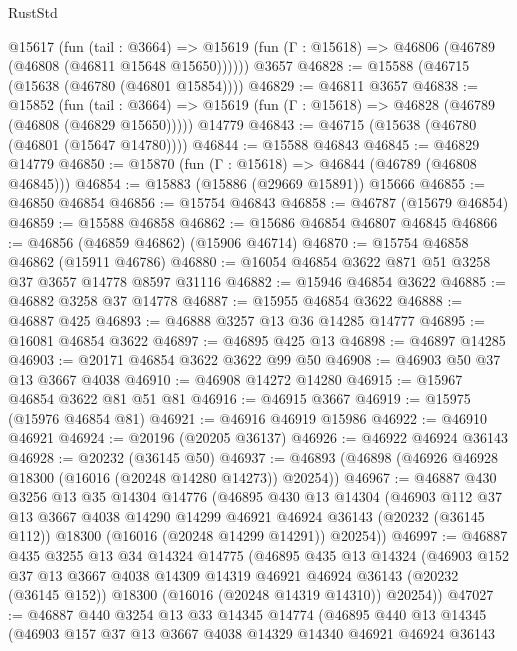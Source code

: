 \begin{lexlean}{RustStd}
\begin{coremodule}
    @15617
      (fun (tail : @3664) =>
      @15619 (fun (Γ : @15618) => @46806 (@46789 (@46808 (@46811 @15648 @15650))))))
    @3657
@46828 := @15588 (@46715 (@15638 (@46780 (@46801 @15854))))
@46829 := @46811 @3657
@46838 := @15852
    (fun (tail : @3664) => @15619 (fun (Γ : @15618) => @46828 (@46789 (@46808 (@46829 @15650)))))
    @14779
@46843 := @46715 (@15638 (@46780 (@46801 (@15647 @14780))))
@46844 := @15588 @46843
@46845 := @46829 @14779
@46850 := @15870 (fun (Γ : @15618) => @46844 (@46789 (@46808 @46845)))
@46854 := @15883 (@15886 (@29669 @15891)) @15666
@46855 := @46850 @46854
@46856 := @15754 @46843
@46858 := @46787 (@15679 @46854)
@46859 := @15588 @46858
@46862 := @15686 @46854 @46807 @46845
@46866 := @46856 (@46859 @46862) (@15906 @46714)
@46870 := @15754 @46858 @46862 (@15911 @46786)
@46880 := @16054 @46854 @3622 @871 @51 @3258 @37 @3657 @14778 @8597 @31116
@46882 := @15946 @46854 @3622
@46885 := @46882 @3258 @37 @14778
@46887 := @15955 @46854 @3622
@46888 := @46887 @425
@46893 := @46888 @3257 @13 @36 @14285 @14777
@46895 := @16081 @46854 @3622
@46897 := @46895 @425 @13
@46898 := @46897 @14285
@46903 := @20171 @46854 @3622 @3622 @99 @50
@46908 := @46903 @50 @37 @13 @3667 @4038
@46910 := @46908 @14272 @14280
@46915 := @15967 @46854 @3622 @81 @51 @81
@46916 := @46915 @3667
@46919 := @15975 (@15976 @46854 @81)
@46921 := @46916 @46919 @15986
@46922 := @46910 @46921
@46924 := @20196 (@20205 @36137)
@46926 := @46922 @46924 @36143
@46928 := @20232 (@36145 @50)
@46937 := @46893 (@46898 (@46926 @46928 @18300 (@16016 (@20248 @14280 @14273)) @20254))
@46967 := @46887
    @430
    @3256
    @13
    @35
    @14304
    @14776
    (@46895
      @430
      @13
      @14304
      (@46903
        @112
        @37
        @13
        @3667
        @4038
        @14290
        @14299
        @46921
        @46924
        @36143
        (@20232 (@36145 @112))
        @18300
        (@16016 (@20248 @14299 @14291))
        @20254))
@46997 := @46887
    @435
    @3255
    @13
    @34
    @14324
    @14775
    (@46895
      @435
      @13
      @14324
      (@46903
        @152
        @37
        @13
        @3667
        @4038
        @14309
        @14319
        @46921
        @46924
        @36143
        (@20232 (@36145 @152))
        @18300
        (@16016 (@20248 @14319 @14310))
        @20254))
@47027 := @46887
    @440
    @3254
    @13
    @33
    @14345
    @14774
    (@46895
      @440
      @13
      @14345
      (@46903
        @157
        @37
        @13
        @3667
        @4038
        @14329
        @14340
        @46921
        @46924
        @36143

\end{coremodule}
\end{lexlean}
